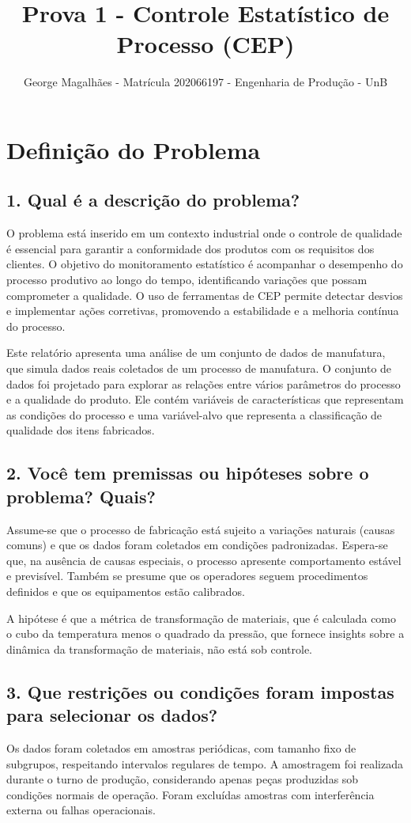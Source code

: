 \documentclass[12pt]{article}
\title{Prova 1 - Controle Estatístico de Processo (CEP)}
\author{George Magalhães - Matrícula 202066197 - Engenharia de Produção - UnB}
\date{}
\begin{document}
\maketitle

\section{Definição do Problema}

\subsection*{1. Qual é a descrição do problema?}
O problema está inserido em um contexto industrial onde o controle de qualidade é essencial para garantir a conformidade dos produtos com os requisitos dos clientes. O objetivo do monitoramento estatístico é acompanhar o desempenho do processo produtivo ao longo do tempo, identificando variações que possam comprometer a qualidade. O uso de ferramentas de CEP permite detectar desvios e implementar ações corretivas, promovendo a estabilidade e a melhoria contínua do processo.

Este relatório apresenta uma análise de um conjunto de dados de manufatura, que simula dados reais coletados de um processo de manufatura. O conjunto de dados foi projetado para explorar as relações entre vários parâmetros do processo e a qualidade do produto. Ele contém variáveis de características que representam as condições do processo e uma variável-alvo que representa a classificação de qualidade dos itens fabricados.

\subsection*{2. Você tem premissas ou hipóteses sobre o problema? Quais?}
Assume-se que o processo de fabricação está sujeito a variações naturais (causas comuns) e que os dados foram coletados em condições padronizadas. Espera-se que, na ausência de causas especiais, o processo apresente comportamento estável e previsível. Também se presume que os operadores seguem procedimentos definidos e que os equipamentos estão calibrados.

A hipótese é que a métrica de transformação de materiais, que é calculada como o cubo da temperatura menos o quadrado da pressão, que fornece insights sobre a dinâmica da transformação de materiais, não está sob controle.

\subsection*{3. Que restrições ou condições foram impostas para selecionar os dados?}
Os dados foram coletados em amostras periódicas, com tamanho fixo de subgrupos, respeitando intervalos regulares de tempo. A amostragem foi realizada durante o turno de produção, considerando apenas peças produzidas sob condições normais de operação. Foram excluídas amostras com interferência externa ou falhas operacionais.
\end{document}
